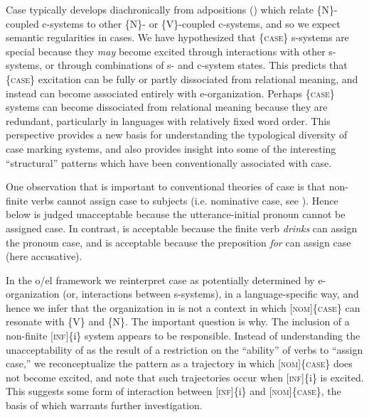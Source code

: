   Case typically develops diachronically from adpositions (\citealt{Heine2009,TraugottHeine1991}) which relate \{N\}-coupled c-systems to other \{N\}- or \{V\}-coupled c-systems, and so we expect semantic regularities in cases. We have hypothesized that \{\textsc{case}\} s-systems are special because they \textit{may} become excited through interactions with other s-systems, or through combinations of s- and c-system states. This predicts that \{\textsc{case}\} excitation can be fully or partly dissociated from relational meaning, and instead can become associated entirely with e-organization. Perhaps \{\textsc{case}\} systems can become dissociated from relational meaning because they are redundant, particularly in languages with relatively fixed word order. This perspective provides a new basis for understanding the typological diversity of case marking systems, and also provides insight into some of the interesting “structural” patterns which have been conventionally associated with case. 

  One observation that is important to conventional theories of case is that non-finite verbs cannot assign case to subjects (i.e. nominative case, see \citealt{Chomsky1980,ChomskyLasnik1977,Vergnaud2006}). Hence  below is judged unacceptable because the utterance-initial pronoun cannot be assigned case. In contrast,  is acceptable because the finite verb \textit{drinks} can assign the pronoun case, and  is acceptable because the preposition \textit{for} can assign case (here accusative).

\ea


\z
\z

  In the o/el framework we reinterpret case as potentially determined by e-organization (or, interactions between s-systems), in a language-specific way, and hence we infer that the organization in  is not a context in which [\textsc{nom}]\{\textsc{case}\} can resonate with \{V\} and \{N\}. The important question is why. The inclusion of a non-finite [\textsc{inf}]\{i\} system appears to be responsible. Instead of understanding the unacceptability of  as the result of a restriction on the “ability” of verbs to “assign case,” we reconceptualize the pattern as a trajectory in which [\textsc{nom}]\{\textsc{case}\} does not become excited, and note that such trajectories occur when [\textsc{inf}]\{i\} is excited. This suggests some form of interaction between [\textsc{inf}]\{i\} and [\textsc{nom}]\{\textsc{case}\}, the basis of which warrants further investigation.


